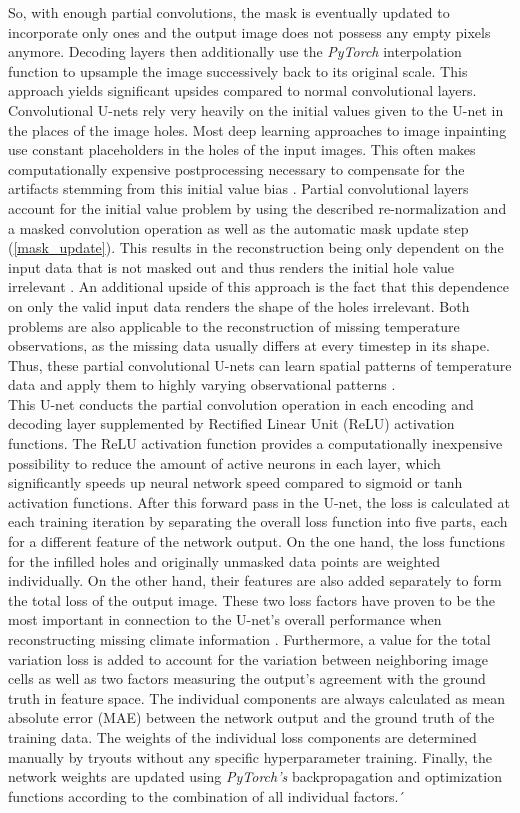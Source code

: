\documentclass[Masterarbeit.tex]{subfile}
\begin{document}
	So, with enough partial convolutions, the mask is eventually updated to incorporate only ones and the output image does not possess any empty pixels anymore. Decoding layers then additionally use the \textit{PyTorch} interpolation function to upsample the image successively back to its original scale. This approach yields significant upsides compared to normal convolutional layers. Convolutional U-nets rely very heavily on the initial values given to the U-net in the places of the image holes. Most deep learning approaches to image inpainting use constant placeholders in the holes of the input images. This often makes computationally expensive postprocessing necessary to compensate for the artifacts stemming from this initial value bias \citep{liu_image_2018}. Partial convolutional layers account for the initial value problem by using the described re-normalization and a masked convolution operation as well as the automatic mask update step (\ref{mask_update}). This results in the reconstruction being only dependent on the input data that is not masked out and thus renders the initial hole value irrelevant \citep{liu_image_2018}. An additional upside of this approach is the fact that this dependence on only the valid input data renders the shape of the holes irrelevant. Both problems are also applicable to the reconstruction of missing temperature observations, as the missing data usually differs at every timestep in its shape. Thus, these partial convolutional U-nets can learn spatial patterns of temperature data and apply them to highly varying observational patterns \cite{kadow_artificial_2020}.\\
	This U-net conducts the partial convolution operation in each encoding and decoding layer supplemented by Rectified Linear Unit (ReLU) activation functions. The ReLU activation function provides a computationally inexpensive possibility to reduce the amount of active neurons in each layer, which significantly speeds up neural network speed compared to sigmoid or tanh activation functions. After this forward pass in the U-net, the loss is calculated at each training iteration by separating the overall loss function into five parts, each for a different feature of the network output. On the one hand, the loss functions for the infilled holes and originally unmasked data points are weighted individually. On the other hand, their features are also added separately to form the total loss of the output image. These two loss factors have proven to be the most important in connection to the U-net's overall performance when reconstructing missing climate information \cite{etienne_personal}. Furthermore, a value for the total variation loss is added to account for the variation between neighboring image cells as well as two factors measuring the output's agreement with the ground truth in feature space. The individual components are always calculated as mean absolute error (MAE) between the network output and the ground truth of the training data. The weights of the individual loss components are determined manually by tryouts without any specific hyperparameter training. Finally, the network weights are updated using \textit{PyTorch's} backpropagation and optimization functions according to the combination of all individual factors.´
	
\end{document}
